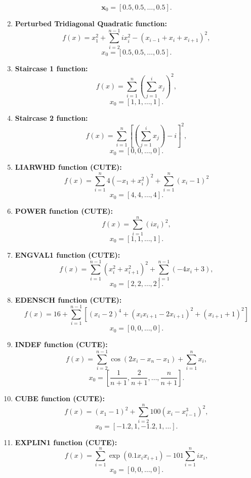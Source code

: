 \documentclass[10pt]{article}
\begin{document}
\begin{enumerate}
    \[
    \mathbf{x}_0 = [0.5, 0.5, \ldots, 0.5].
    \]

    \item \textbf{Perturbed Tridiagonal Quadratic function:}
    \[
    f(x) = x_1^2 + \sum_{i=2}^{n-1} i x_i^2 -  (x_{i-1} +  x_i + x_{i+1})^2,
    \]
    \[
    x_0 = [0.5, 0.5, \dots, 0.5].
    \]

    \item \textbf{Staircase 1 function:}
    \[
    f(x) = \sum_{i=1}^{n} \left( \sum_{j=1}^{i} x_j \right)^2,
    \]
    \[
    x_0 = [1, 1, \dots, 1].
    \]

    \item \textbf{Staircase 2 function:}
    \[
    f(x) = \sum_{i=1}^{n}\left[\left( \sum_{j=1}^{i}  x_j\right) - i \right]^2,
    \]
    \[
    x_0 = [0, 0, \dots, 0].
    \]

    \item \textbf{LIARWHD function (CUTE):}
    \[
    f(x) = \sum_{i=1}^n 4(-x_1 + x_i^2)^2 + \sum_{i=1}^n(x_i - 1)^2
    \]
    \[
    x_0 = [4, 4, \dots, 4].
    \]

    \item \textbf{POWER function (CUTE):}
    \[
    f(x) = \sum_{i=1}^{n} (i x_i)^2,
    \]
    \[
    x_0 = [1, 1, \dots, 1].
    \]

    \item \textbf{ENGVAL1 function (CUTE):}
    \[
    f(x) = \sum_{i=1}^{n-1} \left( x_i^2 + x_{i+1}^2\right)^2 + \sum_{i=1}^{n-1} \left( -4 x_i + 3 \right),
    \]
    \[
    x_0 = [2, 2, \dots, 2].
    \]


    \item \textbf{EDENSCH function (CUTE):}
    \[
    f(x) = 16 + \sum_{i=1}^{n-1} \left[ (x_i - 2)^4 + (x_i x_{i+1} - 2x_{i+1})^2 + (x_{i+1} + 1)^2\right]
    \]
    \[
    x_0 = [0, 0, \dots, 0].
    \]

    \item \textbf{INDEF function (CUTE):}
    \[
    f(x) = \sum_{i=2}^{n-1} \cos(2x_i - x_n - x_1) + \sum_{i=1}^{n} x_i,
    \]
    \[
    x_0 = \left[ \frac{1}{n+1}, \frac{2}{n+1}, \dots, \frac{n}{n+1} \right].
    \]

    \item \textbf{CUBE function (CUTE):}
    \[
    f(x) = (x_1 - 1)^2 + \sum_{i=2}^{n} 100 \left( x_i - x_{i-1}^3 \right)^2,
    \]
    \[
    x_0 = [-1.2, 1, -1.2, 1, \dots].
    \]

    \item \textbf{EXPLIN1 function (CUTE):}
    \[
    f(x) = \sum_{i=1}^{n} \exp(0.1 x_ix_{i+1}) - 101 \sum_{i=1}^n ix_i,
    \]
    \[
    x_0 = [0, 0, \dots, 0].
    \]



\end{enumerate}
\end{document}
